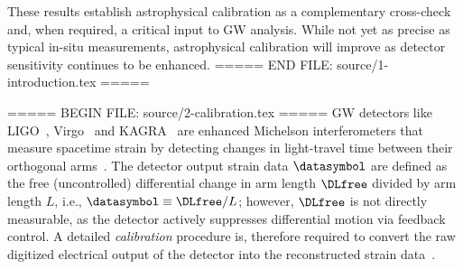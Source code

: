 These results establish astrophysical calibration as a complementary cross-check and, when required, a critical input to \ac{GW} analysis.
While not yet as precise as typical in-situ measurements, astrophysical calibration will improve as detector sensitivity continues to be enhanced.
===== END FILE: source/1-introduction.tex =====

===== BEGIN FILE: source/2-calibration.tex =====
\Ac{GW} detectors like \ac{LIGO}~\cite{LIGOScientific:2014pky}, Virgo~\cite{VIRGO:2014yos} and KAGRA~\cite{KAGRA:2020tym} are enhanced Michelson interferometers that measure spacetime strain by detecting changes in light-travel time between their orthogonal arms~\cite{Freise:2009sf,Pitkin:2011yk}.
The detector output strain data $\datasymbol$ are defined as the free (uncontrolled) differential change in arm length $\DLfree$ divided by arm length $L$, i.e., $\datasymbol\equiv{\DLfree}/{L}$;
however, $\DLfree$ is not directly measurable, as the detector actively suppresses differential motion via feedback control.
A detailed \emph{calibration} procedure is, therefore required to convert the raw digitized electrical output of the detector into the reconstructed strain data~\cite{LIGOScientific:2016xax,LIGOScientific:2017aaj,Viets:2017yvy,Sun:2020wke,KAGRA:2020agh}.

